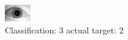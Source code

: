 \begin{figure}[h!]
\begin{center}
\includegraphics[width=0.60\columnwidth]{figures/ID1693_class_3_target_2.png}
\end{center}
\caption{ Classification: 3 actual target: 2}
\label{fig:ID1693_class_3_target_2}
\end{figure}
